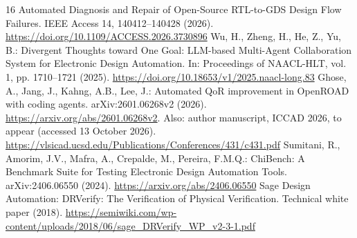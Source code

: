 \documentclass[runningheads]{llncs}
\begin{document}
\begin{thebibliography}{16}
Automated Diagnosis and Repair of Open-Source RTL-to-GDS Design Flow Failures.
IEEE Access 14, 140412--140428 (2026).
\url{https://doi.org/10.1109/ACCESS.2026.3730896}
Wu, H., Zheng, H., He, Z., Yu, B.: Divergent Thoughts toward One Goal:
LLM-based Multi-Agent Collaboration System for Electronic Design Automation.
In: Proceedings of NAACL-HLT, vol. 1, pp. 1710--1721 (2025).
\url{https://doi.org/10.18653/v1/2025.naacl-long.83}
Ghose, A., Jang, J., Kahng, A.B., Lee, J.:
Automated QoR improvement in OpenROAD with coding agents.
arXiv:2601.06268v2 (2026). \url{https://arxiv.org/abs/2601.06268v2}.
Also: author manuscript, ICCAD 2026, to appear (accessed 13 October 2026).
\url{https://vlsicad.ucsd.edu/Publications/Conferences/431/c431.pdf}
Sumitani, R., Amorim, J.V., Mafra, A., Crepalde, M., Pereira, F.M.Q.:
ChiBench: A Benchmark Suite for Testing Electronic Design Automation Tools.
arXiv:2406.06550 (2024). \url{https://arxiv.org/abs/2406.06550}
Sage Design Automation: DRVerify: The Verification of Physical Verification.
Technical white paper (2018).
\url{https://semiwiki.com/wp-content/uploads/2018/06/sage_DRVerify_WP_v2-3-1.pdf}
\end{thebibliography}
\end{document}

